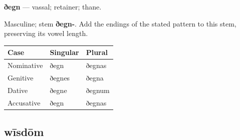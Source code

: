 \par\begin{minipage}{\linewidth}\raggedright
\textbf{ðegn} — vassal; retainer; thane.

Masculine; stem \textbf{ðegn-}. Add the endings of the stated pattern to this stem, preserving its vowel length.

\par\begingroup
\fontsize{10.5}{13.2}\selectfont
\setlength{\LTleft}{0pt}\setlength{\LTright}{\fill}
\noindent
\begin{tabular}{@{}>{\raggedright\arraybackslash}p{39.46mm}>{\raggedright\arraybackslash}p{39.46mm}>{\raggedright\arraybackslash}p{39.46mm}@{}}
\toprule
\textbf{Case} & \textbf{Singular} & \textbf{Plural} \\
\midrule
Nominative & ðegn & ðegnas \\
Genitive & ðegnes & ðegna \\
Dative & ðegne & ðegnum \\
Accusative & ðegn & ðegnas \\
\bottomrule
\end{tabular}
\par\endgroup

\end{minipage}\par
{}
\subsection*{wīsdōm}


